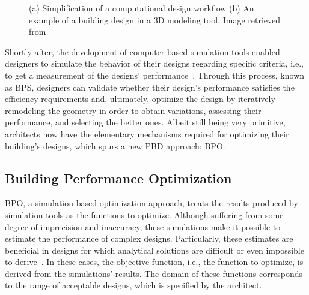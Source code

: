 \begin{figure}[htbp]
\centering
{}%
\hfill
{}%

\caption[General view of Traditional Design Approaches]{(a) Simplification of a computational design workflow (b) An example of a building design in a 3D modeling tool. Image retrieved from~\cite{3DMODELTOOL}}
\label{fig:traditionaldesign}
\end{figure}

Shortly after, the development of computer-based simulation tools enabled designers to simulate the behavior of their designs regarding specific criteria, i.e., to get a measurement of the designs' performance~\cite{Malkawi2005}. Through this process, known as \ac{BPS}, designers can validate whether their design's performance satisfies the efficiency requirements and, ultimately, optimize the design by iteratively remodeling the geometry in order to obtain variations, assessing their performance, and selecting the better ones. Albeit still being very primitive, architects now have the elementary mechanisms required for optimizing their building's designs, which spurs a new \ac{PBD} approach: \ac{BPO}.

\subsection{Building Performance Optimization}

	\ac{BPO}, a simulation-based optimization approach, treats the results produced by simulation tools as the functions to optimize. Although suffering from some degree of imprecision and inaccuracy, these simulations make it possible to estimate the performance of complex designs. Particularly, these estimates are beneficial in designs for which analytical solutions are difficult or even impossible to derive~\cite{Kolda2003}. In these cases, the objective function, i.e., the function to optimize, is derived from the simulations' results. The domain of these functions corresponds to the range of acceptable designs,  which is specified by the architect.

